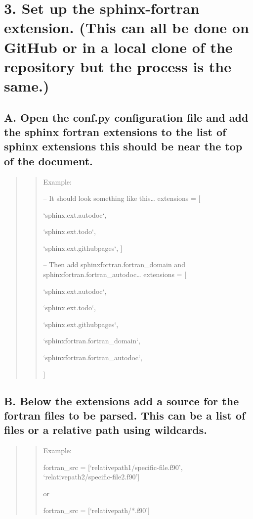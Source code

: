 \documentclass[letterpaper,10pt,english]{sphinxmanual}
\begin{document}
\section{3. Set up the sphinx-fortran extension. (This can all be done on GitHub or in a local clone of the repository but the process is the same.)}
\label{docs/Process:set-up-the-sphinx-fortran-extension-this-can-all-be-done-on-github-or-in-a-local-clone-of-the-repository-but-the-process-is-the-same}

\subsection{A. Open the conf.py configuration file and add the sphinx fortran extensions to the list of sphinx extensions this should be near the top of the document.}
\label{docs/Process:a-open-the-conf-py-configuration-file-and-add-the-sphinx-fortran-extensions-to-the-list-of-sphinx-extensions-this-should-be-near-the-top-of-the-document}\begin{quote}
\begin{quote}

Example:

-- It should look something like this…
extensions = {[}

`sphinx.ext.autodoc`,

`sphinx.ext.todo`,

`sphinx.ext.githubpages`,
{]}

-- Then add sphinxfortran.fortran\_domain and sphinxfortran.fortran\_autodoc…
extensions = {[}

`sphinx.ext.autodoc`,

`sphinx.ext.todo`,

`sphinx.ext.githubpages`,

`sphinxfortran.fortran\_domain`,

`sphinxfortran.fortran\_autodoc`,

{]}
\end{quote}
\end{quote}


\subsection{B. Below the extensions add a source for the fortran files to be parsed. This can be a list of files or a relative path using wildcards.}
\label{docs/Process:b-below-the-extensions-add-a-source-for-the-fortran-files-to-be-parsed-this-can-be-a-list-of-files-or-a-relative-path-using-wildcards}\begin{quote}
\begin{quote}

Example:

fortran\_src = {[}‘relativepath1/specific-file.f90’, ‘relativepath2/specific-file2.f90’{]}

or

fortran\_src = {[}‘relativepath/*.f90’{]}
\end{quote}
\end{quote}
\end{document}
